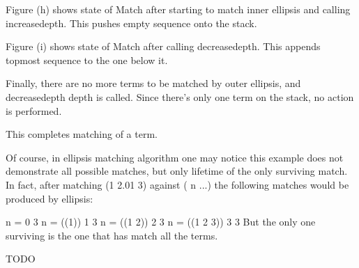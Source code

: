 Figure (h) shows state of Match after starting to match inner ellipsis and calling increasedepth. This pushes empty sequence onto the stack.

Figure (i) shows state of Match after calling decreasedepth. This appends topmost sequence to the one below it.

Finally, there are no more terms to be matched by outer ellipsis, and decreasedepth depth is called. Since there's only one term on the stack, no action is performed.

This completes matching of a term. 

Of course, in ellipsis matching algorithm one may notice this example does not demonstrate all possible matches, but only lifetime of the only surviving match. In fact, after matching (1 2.01 3) against ( n ...) the following matches would be produced by ellipsis:

n =         0 3
n = ((1))   1 3
n = ((1 2)) 2 3
n = ((1 2 3)) 3 3
But the only one surviving is the one that has match all the terms. 

TODO 
